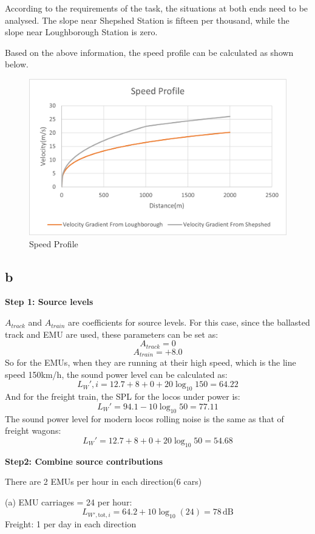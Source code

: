 \documentclass[letterpaper,12pt,leqno]{article}
\begin{document}
According to the requirements of the task, the situations at both ends need to be analysed. The slope near Shepshed Station is fifteen per thousand, while the slope near Loughborough Station is zero. 

Based on the above information, the speed profile can be calculated as shown below.

\begin{figure}[H]
	\centering
	\includegraphics[width=\linewidth]{speedprofile.png}
	\caption{Speed Profile}
\end{figure}

\subsection{b}
	\textbf{Step 1: Source levels}
	
	$A_{track}$ and $A_{train}$ are coefficients for source levels. For this case, since the ballasted track and EMU are used, these parameters can be set as:
	$$A_{track}=0$$ $$A_{train}=+8.0$$
	So for the EMUs, when they are running at their high speed, which is the line speed 150km/h, the sound power level can be calculated as:
	$$L_W',i = 12.7+8 +0 +20 \log_{10}150=64.22$$
	And for the freight train, the SPL for the locos under power is:
	$$L_W' = 94.1-10 \log_{10}50= 77.11$$
	The sound power level for modern locos rolling noise is the same as that of freight wagons:
	$$L_W' = 12.7+8 +0 +20 \log_{10}50=54.68 $$
	
	\textbf{Step2: Combine source contributions}
	
	There are 2 EMUs per hour in each direction(6 cars)
	
	(a) EMU carriages = 24 per hour:
	$$L_{W', \text{tot}, i} = 64.2 + 10 \log_{10}(24) = 78 \, \text{dB}$$
	Freight: 1 per day in each direction
	
\end{document}
